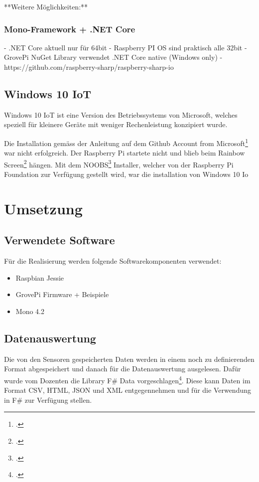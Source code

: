 **Weitere Möglichkeiten:**

\subsubsection{Mono-Framework + .NET Core}
  - .NET Core aktuell nur für 64bit
  - Raspberry PI OS sind praktisch alle 32bit
  - GrovePi NuGet Library verwendet .NET Core native (Windows only)
  - https://github.com/raspberry-sharp/raspberry-sharp-io

\subsection{Windows 10 IoT}
Windows 10 IoT ist eine Version des Betriebssystems von Microsoft, welches speziell für kleinere Geräte mit weniger Rechenleistung konzipiert wurde.

Die Installation gemäss der Anleitung auf dem Github Account from Microsoft\footcite{install_win10iot_2016-04-25} war nicht erfolgreich. 
Der Raspberry Pi startete nicht und blieb beim Rainbow Screen\footcite{RPi_Rainbowscreen_2016-04-25} hängen. 
Mit dem NOOBS\footcite{NOOBS_2016-04-25} Installer, welcher von der Raspberry Pi Foundation zur Verfügung gestellt wird, war die installation von Windows 10 Io


\section{Umsetzung}

\subsection{Verwendete Software}
Für die Realisierung werden folgende Softwarekomponenten verwendet:

\begin{itemize}
\item Raspbian Jessie
\item GrovePi Firmware + Beispiele
\item Mono 4.2
\end{itemize}




\subsection{Datenauswertung}
Die von den Sensoren gespeicherten Daten werden in einem noch zu definierenden Format abgespeichert und danach für die Datenauswertung ausgelesen. Dafür wurde vom Dozenten die Library F\# Data vorgeschlagen\footcite{Fsharp_Data_2016-04-24}. Diese kann Daten im Format CSV, HTML, JSON und XML entgegennehmen und für die Verwendung in F\# zur Verfügung stellen.


